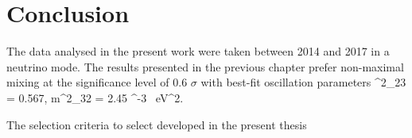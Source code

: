 \chapter{Conclusion}
\label{conclusion_chapter}

The data analysed in the present work were taken between 2014 and 2017 in a neutrino mode. The results 
presented in the previous chapter prefer non-maximal mixing at the significance level of 0.6 $\sigma$
with best-fit oscillation parameters
\be
\sin^2\theta_{23} = 0.567, \nn
\ee
\be
\Delta m^2_{32} = 2.45 ^{-3}~ eV^2. \nn
\ee

The selection criteria to select developed in the present thesis 

